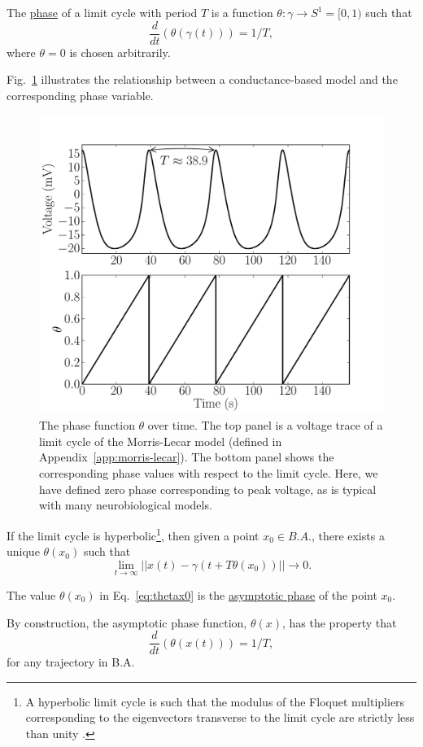 \documentclass[12pt]{article}
\begin{document}
  \begin{definition} The \underline{phase} of a limit cycle with period $T$ is a function $\theta: \gamma \rightarrow S^1 = [0,1)$ such that
  \begin{equation}
  \frac{d}{dt}\left (\theta(\gamma(t)) \right ) = 1/T,
  \end{equation}
  where $\theta = 0$ is chosen arbitrarily.
  \end{definition}
  Fig.~\ref{fig:dthetadt} illustrates the relationship between a conductance-based model and the corresponding phase variable.
  
  \begin{figure}[h!]
   \includegraphics[width=\textwidth]{dthetadt_fig.pdf}
   \caption[The phase function $\theta$ over time]{The phase function $\theta$ over time.  The top panel is a voltage trace of a limit cycle of the Morris-Lecar model (defined in Appendix~\ref{app:morris-lecar}).  The bottom panel shows the corresponding phase values with respect to the limit cycle.  Here, we have defined zero phase corresponding to peak voltage, as is typical with many neurobiological models.}
  \label{fig:dthetadt}\end{figure}
  If the limit cycle is hyperbolic\footnote{A hyperbolic limit cycle is such that the modulus of the Floquet multipliers corresponding to the eigenvectors transverse to the limit cycle are strictly less than unity \cite{Guckenheimer1975JMathBiol}.}, then given a point $x_0 \in B.A.$, there exists a unique $\theta(x_0)$  such that 
  \begin{equation}\label{eq:thetax0}
    \lim_{t \rightarrow \infty} || x(t) - \gamma(t + T\theta(x_0)) || \rightarrow 0.
  \end{equation}
  \begin{definition}
  The value $\theta(x_0)$ in Eq.~\eqref{eq:thetax0} is the \underline{asymptotic phase} of the point $x_0$.
  \end{definition}
  By construction, the asymptotic phase function, $\theta(x)$, has the property that
  \begin{equation}
   \frac{d }{dt}\left (\theta(x(t)) \right ) = 1/T,
  \end{equation}
  for any trajectory in B.A.
  
\end{document}
